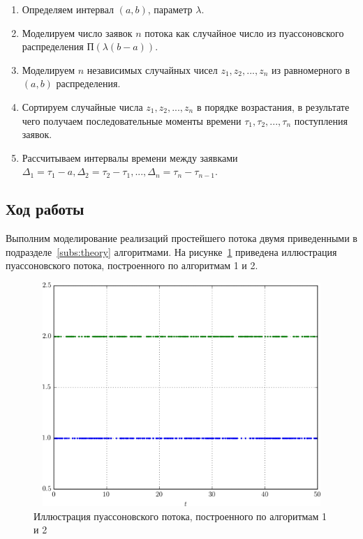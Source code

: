 \begin{enumerate}
  \item Определяем интервал $(a, b)$, параметр $\lambda$.
  \item Моделируем число заявок $n$ потока как случайное число из пуассоновского
    распределения $\text{П}(\lambda (b-a))$.
  \item Моделируем $n$ независимых случайных чисел $z_1, z_2, ..., z_n$ из
    равномерного в $(a,b)$ распределения.
  \item Сортируем случайные числа $ z_1, z_2, ..., z_n $ в порядке возрастания,
    в результате чего получаем последовательные моменты
    времени $ \tau_1, \tau_2, ..., \tau_n$ поступления заявок.
  \item Рассчитываем интервалы времени между заявками $ \Delta_1 =
    \tau_1 - a, \Delta_2 = \tau_2 - \tau_1, ..., \Delta_n = \tau_n - \tau_{n-1} $.
\end{enumerate}

\subsection{Ход работы}

Выполним моделирование реализаций простейшего потока двумя приведенными
в подразделе~\ref{subs:theory} алгоритмами. На рисунке~\ref{pic:times} приведена
иллюстрация пуассоновского потока, построенного по алгоритмам 1 и 2.

\begin{figure}[h!]
  \centering
  \includegraphics[width=150mm, height=85mm]{pic/times}
  \caption{Иллюстрация пуассоновского потока, построенного по алгоритмам 1 и 2}
  \label{pic:times}
\end{figure}

